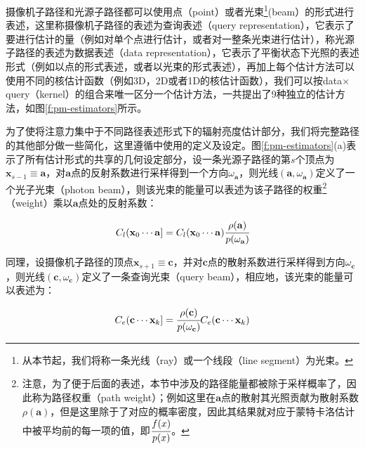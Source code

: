 摄像机子路径和光源子路径都可以使用点（point）或者光束\footnote{从本节起，我们将称一条光线（ray）或一个线段（line segment）为光束。}(beam）的形式进行表述，这里称摄像机子路径的表述为查询表述（query representation），它表示了要进行估计的量（例如对单个点进行估计，或者对一整条光束进行估计），称光源子路径的表述为数据表述（data representation），它表示了平衡状态下光照的表述形式（例如以点的形式表述，或者以光束的形式表述），再加上每个估计方法可以使用不同的核估计函数（例如3D，2D或者1D的核估计函数），我们可以按data$\times$query（kernel）的组合来唯一区分一个估计方法，\cite{a:AComprehensiveTheoryofVolumetricRadianceEstimationusingPhotonPointsandBeams}一共提出了9种独立的估计方法，如图\ref{f:pm-estimators}所示。

为了使将注意力集中于不同路径表述形式下的辐射亮度估计部分，我们将完整路径的其他部分做一些简化，这里遵循\cite{a:UnifyingPointsBeamsandPathsinVolumetricLightTransportSimulation}中使用的定义及设定。图\ref{f:pm-estimators}(a)表示了所有估计形式的共享的几何设定部分，设一条光源子路径的第$s$个顶点为$\mathbf{x}_{s-1}\equiv \mathbf{a}$，对$\mathbf{a}$点的反射系数进行采样得到一个方向$\omega_{\mathbf{a}}$，则光线$(\mathbf{a},\omega_{\mathbf{a}})$定义了一个光子光束（photon beam），则该光束的能量可以表述为该子路径的权重\footnote{注意，为了便于后面的表述，本节中涉及的路径能量都被除于采样概率了，因此称为路径权重（path weight）；例如这里在$\mathbf{a}$点的散射其光照贡献为散射系数$\rho(\mathbf{a})$，但是这里除于了对应的概率密度，因此其结果就对应于蒙特卡洛估计中被平均前的每一项的值，即$ \cfrac{f(x)}{p(x)}$。}（weight）乘以$\mathbf{a}$点处的反射系数：

\begin{equation}
	C_l(\mathbf{x}_0\cdots\mathbf{a}]=C_l(\mathbf{x}_0\cdots\mathbf{a}) \cfrac{\rho(\mathbf{a})}{p(\omega_{\mathbf{a}})}
\end{equation}

同理，设摄像机子路径的顶点$\mathbf{x}_{s+1}\equiv\mathbf{c}$，并对$\mathbf{c}$点的散射系数进行采样得到方向$\omega_{\mathbf{c}}$，则光线$(\mathbf{c},\omega_{\mathbf{c}})$定义了一条查询光束（query beam），相应地，该光束的能量可以表述为：

\begin{equation}
	C_e(\mathbf{c}\cdots\mathbf{x}_k]= \cfrac{\rho(\mathbf{c})}{p(\omega_{\mathbf{c}})}C_e(\mathbf{c}\cdots\mathbf{x}_k)
\end{equation}

